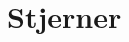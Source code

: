 \documentclass[crop=false, class=memoir]{standalone}
\begin{document}
\section{Stjerner}
\end{document}

